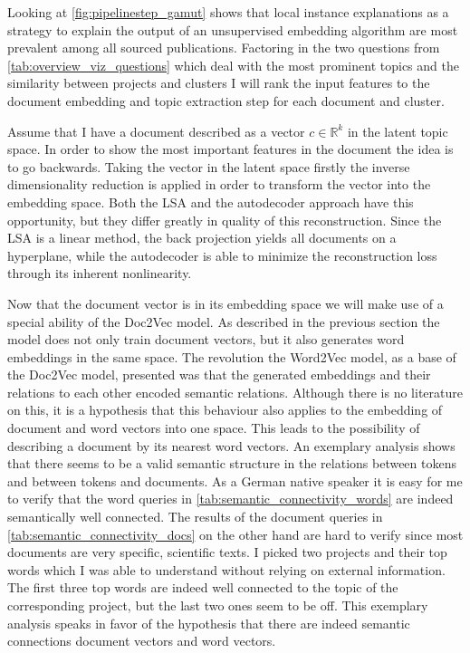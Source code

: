 Looking at \autoref{fig:pipelinestep_gamut} shows that local instance explanations as a strategy to explain the output of an unsupervised embedding algorithm are most prevalent among all sourced publications. Factoring in the two questions from \autoref{tab:overview_viz_questions} which deal with the most prominent topics and the similarity between projects and clusters I will rank the input features to the document embedding and topic extraction step for each document and cluster. 

Assume that I have a document described as a vector $c \in \mathbb{R}^k$ in the latent topic space. In order to show the most important features in the document the idea is to go backwards. Taking the vector in the latent space firstly the inverse dimensionality reduction is applied in order to transform the vector into the embedding space. Both the LSA and the autodecoder approach have this opportunity, but they differ greatly in quality of this reconstruction. Since the LSA is a linear method, the back projection yields all documents on a hyperplane, while the autodecoder is able to minimize the reconstruction loss through its inherent nonlinearity. 

Now that the document vector is in its embedding space we will make use of a special ability of the Doc2Vec model. As described in the previous section the model does not only train document vectors, but it also generates word embeddings in the same space. The revolution the Word2Vec model, as a base of the Doc2Vec model, presented was that the generated embeddings and their relations to each other encoded semantic relations. Although there is no literature on this, it is a hypothesis that this behaviour also applies to the embedding of document and word vectors into one space. This leads to the possibility of describing a document by its nearest word vectors. An exemplary analysis shows that there seems to be a valid semantic structure in the relations between tokens and between tokens and documents. As a German native speaker it is easy for me to verify that the word queries in \autoref{tab:semantic_connectivity_words} are indeed semantically well connected. The results of the document queries in \autoref{tab:semantic_connectivity_docs} on the other hand are hard to verify since most documents are very specific, scientific texts. I picked two projects and their top words which I was able to understand without relying on external information. The first three top words are indeed well connected to the topic of the corresponding project, but the last two ones seem to be off. This exemplary analysis speaks in favor of the hypothesis that there are indeed semantic connections document vectors and word vectors.

